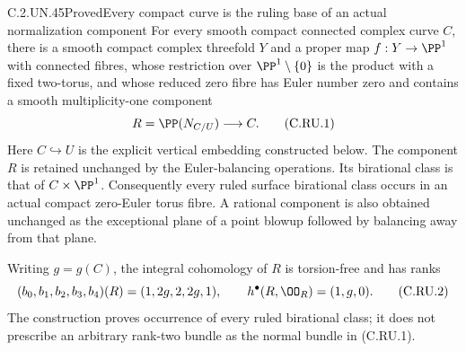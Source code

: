 \begin{statement}{C.2.UN.45}{Proved}{Every compact curve is the ruling base of an actual normalization component}
For every smooth compact connected complex curve $C$, there is a smooth
compact complex threefold $Y$ and a proper map $f:Y\to\PP^1$ with connected
fibres, whose restriction over $\PP^1\setminus\{0\}$ is the product with a
fixed two-torus, and whose reduced zero fibre has Euler number zero and
contains a smooth multiplicity-one component
\[
                         R=\PP(N_{C/U})\longrightarrow C.
\tag{C.RU.1}
\]
Here $C\hookrightarrow U$ is the explicit vertical embedding constructed
below. The component $R$ is retained unchanged by the Euler-balancing
operations. Its birational class is that of $C\times\PP^1$.
Consequently every ruled surface birational class occurs in an actual
compact zero-Euler torus fibre. A rational component is also obtained
unchanged as the exceptional plane of a point blowup followed by balancing
away from that plane.

Writing $g=g(C)$, the integral cohomology of $R$ is torsion-free and has ranks
\[
              (b_0,b_1,b_2,b_3,b_4)(R)=(1,2g,2,2g,1),
              \qquad h^\bullet(R,\OO_R)=(1,g,0).
\tag{C.RU.2}
\]
The construction proves occurrence of every ruled birational class; it
does not prescribe an arbitrary rank-two bundle as the normal bundle in
(C.RU.1).
\end{statement}

